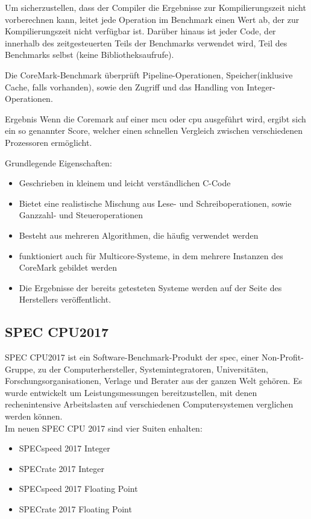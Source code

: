   Um sicherzustellen, dass der Compiler die Ergebnisse zur Kompilierungszeit nicht vorberechnen kann, leitet jede Operation im Benchmark einen Wert ab,
  der zur Kompilierungszeit nicht verfügbar ist. Darüber hinaus ist jeder Code, der innerhalb des zeitgesteuerten Teils der Benchmarks verwendet wird,
  Teil des Benchmarks selbst (keine Bibliotheksaufrufe).

  Die CoreMark-Benchmark überprüft Pipeline-Operationen, Speicher(inklusive Cache, falls vorhanden), sowie den Zugriff und das Handling von Integer-Operationen.

  Ergebnis
  Wenn die Coremark auf einer \ac{mcu} oder \ac{cpu} ausgeführt wird, ergibt sich ein so genannter Score, welcher einen schnellen Vergleich zwischen verschiedenen Prozessoren ermöglicht.


  Grundlegende Eigenschaften:
\begin{itemize}
  \item Geschrieben in kleinem und leicht verständlichen C-Code
  \item Bietet eine realistische Mischung aus Lese- und Schreiboperationen, sowie Ganzzahl- und Steueroperationen
  \item Besteht aus mehreren Algorithmen, die häufig verwendet werden
  \item funktioniert auch für Multicore-Systeme, in dem mehrere Instanzen des CoreMark gebildet werden
  \item Die Ergebnisse der bereits getesteten Systeme werden auf der Seite des Herstellers veröffentlicht.
\end{itemize}


\subsection{SPEC CPU2017}\label{kap:spec}
SPEC CPU2017 ist ein Software-Benchmark-Produkt der \ac{spec}, einer Non-Profit-Gruppe, zu der Computerhersteller,
Systemintegratoren, Universitäten, Forschungsorganisationen, Verlage und Berater aus der ganzen Welt gehören. Es wurde entwickelt
um Leistungsmessungen bereitzustellen, mit denen rechenintensive Arbeitslasten auf verschiedenen Computersystemen verglichen werden können.\\

Im neuen SPEC CPU 2017 sind vier Suiten enhalten:\\
\begin{itemize}
\item SPECspeed 2017 Integer
\item SPECrate 2017 Integer
\item SPECspeed 2017 Floating Point
\item SPECrate 2017 Floating Point
\end{itemize}

